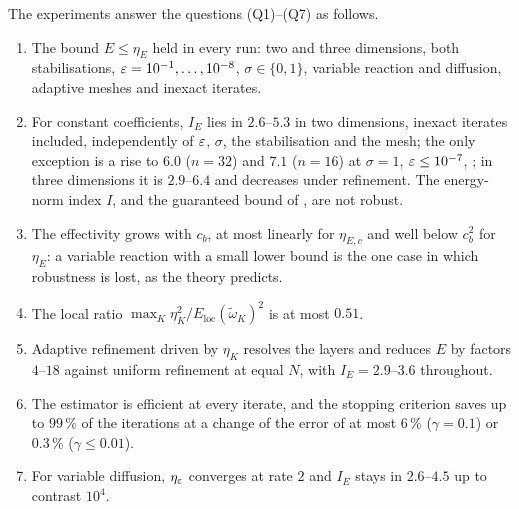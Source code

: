 The experiments answer the questions (Q1)--(Q7) as follows.
\begin{enumerate}[label=(Q\arabic*)]
  \item The bound $E\le\eta_E$ held in every run: two and three dimensions, both stabilisations,
  $\varepsilon=10^{-1},\dots,10^{-8}$, $\sigma\in\{0,1\}$, variable reaction and diffusion, adaptive meshes and inexact
  iterates.
  \item For constant coefficients, $I_E$ lies in $2.6$--$5.3$ in two dimensions, inexact iterates included,
  independently of $\varepsilon$, $\sigma$, the stabilisation and the mesh; the only exception is a rise to $6.0$
  ($n=32$) and $7.1$ ($n=16$) at $\sigma=1$, $\varepsilon\le10^{-7}$, ; in three dimensions it is $2.9$--$6.4$ and
  decreases under refinement. The energy-norm index $I$, and the guaranteed bound of \cite{ABR17}, are not
  robust.
  \item The effectivity grows with $c_b$, at most linearly for $\eta_{E,c}$ and well below $c_b^2$ for $\eta_E$:
  a variable reaction with a small lower bound is the one case in which robustness is lost, as the theory
  predicts.
  \item The local ratio $\max_K\eta_K^2/E_{\mathrm{loc}}(\tilde\omega_K)^2$ is at most $0.51$.
  \item Adaptive refinement driven by $\eta_K$ resolves the layers and reduces $E$ by factors $4$--$18$
  against uniform refinement at equal $N$, with $I_E=2.9$--$3.6$ throughout. 
  \item The estimator is efficient at every iterate, and the stopping criterion saves up to $99\,\%$ of the
  iterations at a change of the error of at most $6\,\%$ ($\gamma=0.1$) or $0.3\,\%$ ($\gamma\le0.01$).
  \item For variable diffusion, $\eta_\varepsilon$ converges at rate $2$ and $I_E$ stays in $2.6$--$4.5$ up to contrast
  $10^4$.
\end{enumerate}

